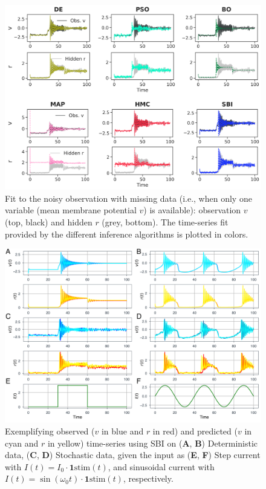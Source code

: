 \documentclass[preprint,11pt,authoryear]{elsarticle}
\begin{document}
\begin{figure}[ht]
    \centering
    \includegraphics[width=\linewidth]{Figs/FigS10.png}
    \renewcommand{\thefigure}{S\arabic{figure}}
    \caption{Fit to the noisy observation with missing data (i.e., when only one variable (mean membrane potential $v$) is available): observation $v$ (top, black) and hidden $r$ (grey, bottom). The time-series fit provided by the different inference algorithms is plotted in colors.}
    \label{fig:SDEmissingdata_timeseries}
\end{figure}



\begin{figure}
    \centering
    \includegraphics[width=\linewidth]{Figs/FigS11.png}
    \renewcommand{\thefigure}{S\arabic{figure}}
    \caption{Exemplifying observed ($v$ in blue and $r$ in red) and predicted ($v$ in cyan and $r$ in yellow) time-series using SBI on (\textbf{A}, \textbf{B}) Deterministic data, (\textbf{C}, \textbf{D}) Stochastic data, given the input as (\textbf{E}, \textbf{F}) Step current with $I(t)=I_0 \cdot \mathbf{1}{\text{stim}}(t)$, and sinusoidal current with $I(t)=\sin (\omega_0 t) \cdot \mathbf{1}{\text{stim}}(t)$, respectively.}
    \label{fig:SBI_Timeseries_ISin_IStep}
\end{figure}
\end{document}
